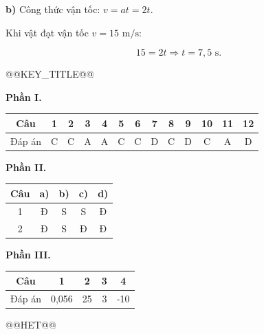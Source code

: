 \documentclass{article}
\begin{document}
\textbf{b)} Công thức vận tốc: $v = at = 2t$.

Khi vật đạt vận tốc $v = 15\text{ m/s}$:

\[15 = 2t \Rightarrow t = 7{,}5\text{ s}.\]



@@KEY_TITLE@@

\textbf{Phần I.}

\begin{tabular}{|c|c|c|c|c|c|c|c|c|c|c|c|c|}\hline
Câu & 1 & 2 & 3 & 4 & 5 & 6 & 7 & 8 & 9 & 10 & 11 & 12 \\ \hline
Đáp án & C & C & A & A & C & C & D & C & D & C & A & D \\ \hline
\end{tabular}

\textbf{Phần II.}

\begin{tabular}{|c|c|c|c|c|}\hline
Câu & a) & b) & c) & d) \\ \hline
1 & Đ & S & S & Đ \\ \hline
2 & Đ & S & Đ & Đ \\ \hline
\end{tabular}

\textbf{Phần III.}

\begin{tabular}{|c|c|c|c|c|}\hline
Câu & 1 & 2 & 3 & 4 \\ \hline
Đáp án & 0,056 & 25 & 3 & -10 \\ \hline
\end{tabular}



@@HET@@
\end{document}
